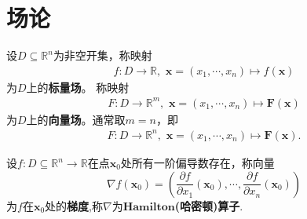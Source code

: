 \documentclass[../../main.tex]{subfiles}%
\begin{document}
\section{场论}

\begin{definition}
设$D\subseteq\mathbb{R}^n$为非空开集，称映射
\begin{align*}
f:D\to\mathbb{R},\,\,\bm{x}=(x_1,\cdots,x_n)\mapsto f(\bm{x})
\end{align*}
为$D$上的\textbf{标量场}。
称映射
\begin{align*}
F:D\to\mathbb{R}^m,\,\,\bm{x}=(x_1,\cdots,x_n)\mapsto \bm{F}(\bm{x})
\end{align*}
为$D$上的\textbf{向量场}。通常取$m=n$，即
\begin{align*}
F:D\to\mathbb{R}^n,\,\,\bm{x}=(x_1,\cdots,x_n)\mapsto \bm{F}(\bm{x}).
\end{align*}
\end{definition}

\begin{definition}
设$f:D\subseteq\mathbb{R}^n\to\mathbb{R}$在点$\bm{x}_0$处所有一阶偏导数存在，称向量
\[
\nabla f(\bm{x}_0)=\left(\frac{\partial f}{\partial x_1}(\bm{x}_0),\cdots,\frac{\partial f}{\partial x_n}(\bm{x}_0)\right)
\]
为$f$在$\bm{x}_0$处的\textbf{梯度},称$\nabla$为$\mathbf{Hamilton}$\textbf{(哈密顿)算子}.
\end{definition}
\end{document}
